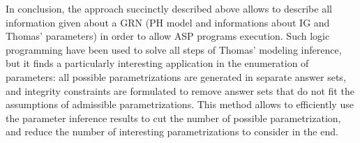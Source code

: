 In conclusion, the approach succinctly described above allows to describe all information given about a GRN (PH model and informations about IG and Thomas' parameters) in order to allow ASP programs execution.
Such logic programming have been used to solve all steps of Thomas' modeling inference, but it finds a particularly interesting application in the enumeration of parameters: all possible parametrizations are generated in separate answer sets, and integrity constraints are formulated to remove answer sets that do not fit the assumptions of admissible parametrizations.
This method allows to efficiently use the parameter inference results to cut the number of possible parametrization, and reduce the number of interesting parametrizations to consider in the end.

